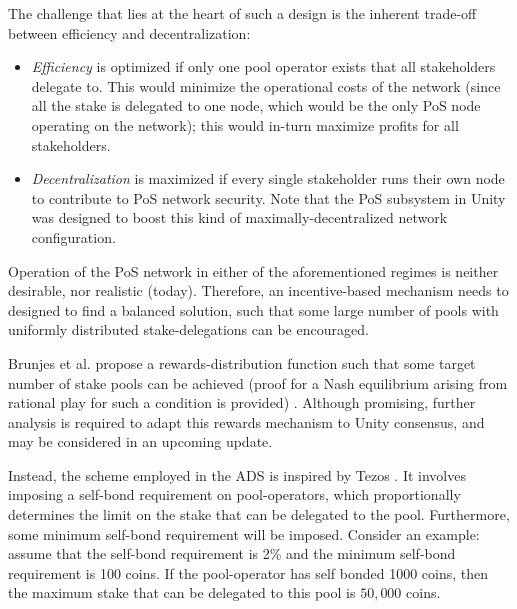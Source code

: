 The challenge that lies at the heart of such a design is the inherent trade-off between efficiency and decentralization: 
\begin{itemize}[label=--,nosep]
    \item \textit{Efficiency} is optimized if only one pool operator exists that all stakeholders delegate to. This would minimize the operational costs of the network (since all the stake is delegated to one node, which would be the only PoS node operating on the network); this would in-turn maximize profits for all stakeholders. 
    \item \textit{Decentralization} is maximized if every single stakeholder runs their own node to contribute to PoS network security. Note that the PoS subsystem in Unity was designed to boost this kind of maximally-decentralized network configuration. 
\end{itemize}

Operation of the PoS network in either of the aforementioned regimes is neither desirable, nor realistic (today). Therefore, an incentive-based mechanism needs to designed to find a balanced solution, such that some large number of pools with uniformly distributed stake-delegations can be encouraged. 

Brunjes et al. propose a rewards-distribution function such that some target number of stake pools can be achieved (proof for a Nash equilibrium arising from rational play for such a condition is provided) \cite{BKK+18}. Although promising, further analysis is required to adapt this rewards mechanism to Unity consensus, and may be considered in an upcoming update. 

Instead, the scheme employed in the ADS is inspired by Tezos \cite{Goo14}. It involves imposing a self-bond requirement on pool-operators, which proportionally determines the limit on the stake that can be delegated to the pool. Furthermore, some minimum self-bond requirement will be imposed. Consider an example: assume that the self-bond requirement is 2\% and the minimum self-bond requirement is 100 coins. If the pool-operator has self bonded 1000 coins, then the maximum stake that can be delegated to this pool is $50,000$ coins.   

